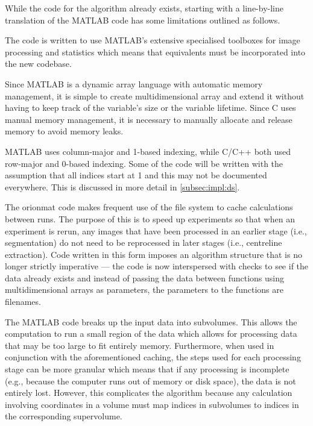 While the code for the algorithm already exists, starting with a line-by-line
translation of the MATLAB code has some limitations outlined as follows.
\begin{description}[font=\textpluscolon]
\item[Toolbox\label{desc:matlab:toolbox}] The code is written to use MATLAB's extensive 
	specialised toolboxes for image processing and
	statistics which means that equivalents must be
	incorporated into the new codebase.
\item[Memory management\label{desc:matlab:mem}] Since MATLAB is a dynamic array language with
	automatic memory management, it is simple to create
	multidimensional array and extend it without having to
	keep track of the variable's size or the variable
	lifetime. Since C uses manual memory management, it is
	necessary to manually allocate and release memory to avoid
	memory leaks.
\item[Data layout differences]
	MATLAB uses column-major and 1-based indexing, while C/C++
	both used row-major and 0-based indexing. Some of the code
	will be written with the assumption that all indices start
	at 1 and this may not be documented everywhere. This is
	discussed in more detail in \cref{subsec:impl:ds}.
\item[Caching\label{desc:matlab:cache}] The \gls{orionmat} code makes frequent use of the file system
	to cache calculations between runs. The purpose of this is
	to speed up experiments so that when an experiment is
	rerun, any images that have been processed in an earlier
	stage (i.e., segmentation) do not need to be reprocessed
	in later stages (i.e., centreline extraction). Code
	written in this form imposes an algorithm structure
	that is no longer strictly imperative --- the code is now
	interspersed with checks to see if the data already exists
	and instead of passing the data between functions using
	multidimensional arrays as parameters, the parameters to
	the functions are filenames.
\item[Subvolume\label{desc:matlab:subvol}] The MATLAB code breaks up the input data into
	subvolumes. This allows the computation to run a small
	region of the data which allows for processing data that
	may be too large to fit entirely memory. Furthermore, when
	used in conjunction with the aforementioned caching, the
	steps used for each processing stage can be more granular
	which means that if any processing is incomplete (e.g.,
	because the computer runs out of memory or disk space),
	the data is not entirely lost. However, this complicates
	the algorithm because any calculation involving
	coordinates in a volume must map indices in subvolumes to
	indices in the corresponding supervolume.
\end{description}

